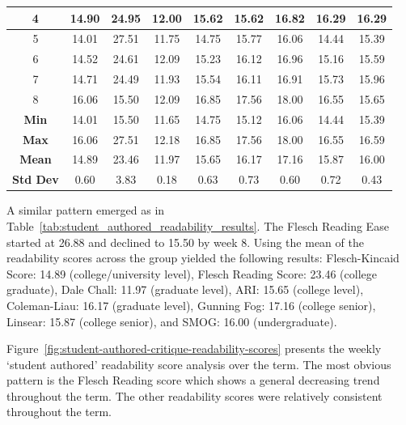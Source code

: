 \begin{table}[h!]
{\begin{tabular}{|c|c|c|c|c|c|c|c|c|}
			4                & 14.90 & 24.95 & 12.00 & 15.62 & 15.62 & 16.82 & 16.29 & 16.29 \\ \hline
			5                & 14.01 & 27.51 & 11.75 & 14.75 & 15.77 & 16.06 & 14.44 & 15.39 \\ \hline
			6                & 14.52 & 24.61 & 12.09 & 15.23 & 16.12 & 16.96 & 15.16 & 15.59 \\ \hline
			7                & 14.71 & 24.49 & 11.93 & 15.54 & 16.11 & 16.91 & 15.73 & 15.96 \\ \hline
			8                & 16.06 & 15.50 & 12.09 & 16.85 & 17.56 & 18.00 & 16.55 & 15.65 \\ \hline
			\rowcolor[HTML]{EFEFEF} 
			\textbf{Min}     & 14.01 & 15.50 & 11.65 & 14.75 & 15.12 & 16.06 & 14.44 & 15.39 \\ \hline
			\rowcolor[HTML]{EFEFEF} 
			\textbf{Max}     & 16.06 & 27.51 & 12.18 & 16.85 & 17.56 & 18.00 & 16.55 & 16.59 \\ \hline
			\rowcolor[HTML]{EFEFEF} 
			\textbf{Mean}    & 14.89 & 23.46 & 11.97 & 15.65 & 16.17 & 17.16 & 15.87 & 16.00 \\ \hline
			\rowcolor[HTML]{EFEFEF} 
			\textbf{Std Dev} & 0.60  & 3.83  & 0.18  & 0.63  & 0.73  & 0.60  & 0.72  & 0.43  \\ \hline
		\end{tabular}%
	}
\end{table}

A similar pattern emerged as in Table~\ref{tab:student_authored_readability_results}.  The  Flesch Reading Ease started at 26.88 and declined to 15.50 by week 8.  Using the mean of the readability scores across the group yielded the following results: Flesch-Kincaid Score: 14.89 (college/university level), Flesch Reading Score: 23.46 (college graduate), Dale Chall: 11.97 (graduate level), ARI: 15.65 (college level), Coleman-Liau: 16.17 (graduate level), Gunning Fog: 17.16 (college senior), Linsear: 15.87 (college senior), and SMOG: 16.00 (undergraduate).

Figure~\ref{fig:student-authored-critique-readability-scores} presents the weekly `student authored' readability score analysis over the term.  The most obvious pattern is the Flesch Reading score which shows a general decreasing trend throughout the term.  The other readability scores were relatively consistent throughout the term. 

